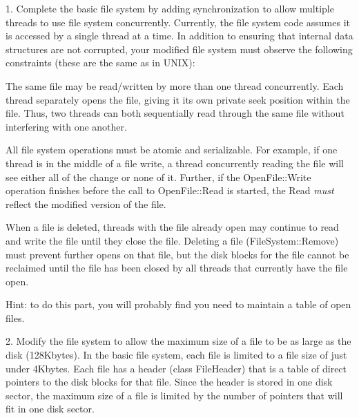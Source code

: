 \begin{description}
\item{1.}
Complete the basic file system by adding synchronization to
allow multiple threads to use file system concurrently.  Currently,
the file system code assumes it is accessed by a single thread at a time.
In addition to ensuring that internal 
data structures are not corrupted, your modified file system must 
observe the following constraints (these are the same as in UNIX):

\begin{description}
\item The same file may be read/written by more than 
one thread concurrently.  Each thread separately opens the file,
giving it its own private seek position within the file.  
Thus, two threads can both sequentially read through the same file
without interfering with one another.

\item All file system operations must be atomic and serializable.
For example, if one thread is in the middle of a file write,
a thread concurrently reading the file will see either all of the change or
none of it.  Further, if the OpenFile::Write operation finishes
before the call to OpenFile::Read is started, the Read {\em must} reflect
the modified version of the file.

\item When a file is deleted, threads with the file already open 
may continue to read and write the file until they close the file.
Deleting a file (FileSystem::Remove) must prevent further opens on 
that file, but the disk blocks for the file cannot be reclaimed 
until the file has been closed by all threads that currently have the 
file open.

\end{description}

Hint: to do this part, you will probably find you need to maintain 
a table of open files.

\item{2.}
Modify the file system to allow the maximum size of a file to be as large 
as the disk (128Kbytes).  In the basic file system, each file is limited 
to a file size of just under 4Kbytes.  Each file has a header 
(class FileHeader) that is a table of direct pointers to the disk blocks 
for that file.  Since the header is stored in one disk sector, the 
maximum size of a file is limited by the number of pointers that will 
fit in one disk sector.


\end{description}
